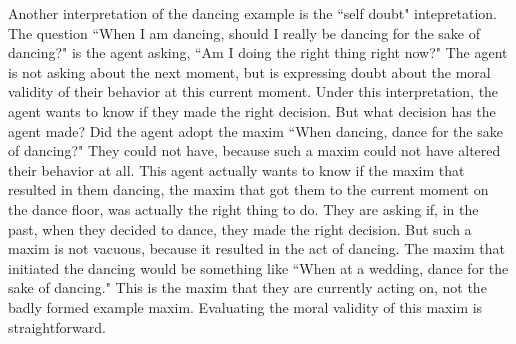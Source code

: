 \begin{isabellebody}
\begin{isamarkuptext}
Another interpretation of the dancing example is the ``self doubt" intepretation. The question ``When I am dancing, 
should I really be dancing for the sake of dancing?" is the agent asking, ``Am I doing the right thing 
right now?" The agent is not asking about the next moment, but is expressing doubt about the 
moral validity of their behavior at this current moment. Under this interpretation, the agent 
wants to know if they made the right decision. But what decision has the agent made? Did the agent
adopt the maxim ``When dancing, dance for the sake of dancing?" They could not have, because such a 
maxim could not have altered their behavior at all. This agent actually wants to know if the maxim that 
resulted in them dancing, the maxim that got them to the current moment on the dance floor, was actually 
the right thing to do. They are asking if, in the past, when they decided to dance, they made the 
right decision. But such a maxim is not vacuous, because it resulted in the act of dancing. 
The maxim that initiated the dancing would be something like ``When at a wedding, dance for the sake 
of dancing." This is the maxim that they are currently acting on, not the badly formed example maxim.
Evaluating the moral validity of this maxim is straightforward.


\end{isamarkuptext}
\end{isabellebody}
